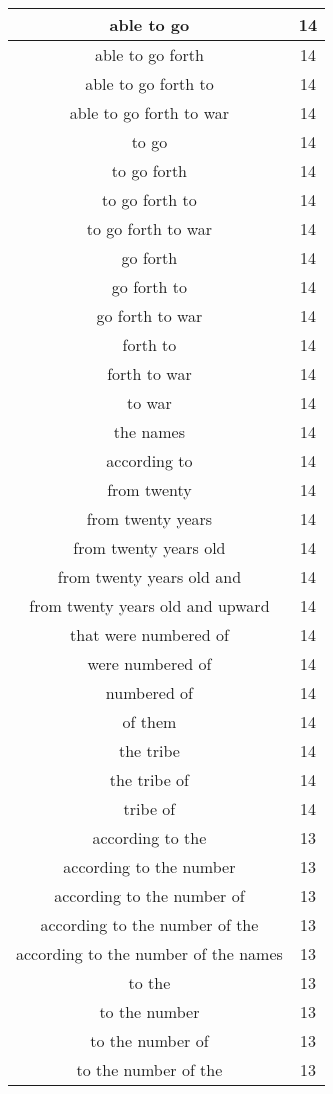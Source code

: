 \begin{center}
\begin{longtable}{|c|c|}
able to go & 14\\ \hline 
able to go forth & 14\\ \hline 
able to go forth to & 14\\ \hline 
able to go forth to war & 14\\ \hline 
to go & 14\\ \hline 
to go forth & 14\\ \hline 
to go forth to & 14\\ \hline 
to go forth to war & 14\\ \hline 
go forth & 14\\ \hline 
go forth to & 14\\ \hline 
go forth to war & 14\\ \hline 
forth to & 14\\ \hline 
forth to war & 14\\ \hline 
to war & 14\\ \hline 
the names & 14\\ \hline 
according to & 14\\ \hline 
from twenty & 14\\ \hline 
from twenty years & 14\\ \hline 
from twenty years old & 14\\ \hline 
from twenty years old and & 14\\ \hline 
from twenty years old and upward & 14\\ \hline 
that were numbered of & 14\\ \hline 
were numbered of & 14\\ \hline 
numbered of & 14\\ \hline 
of them & 14\\ \hline 
the tribe & 14\\ \hline 
the tribe of & 14\\ \hline 
tribe of & 14\\ \hline 
according to the & 13\\ \hline 
according to the number & 13\\ \hline 
according to the number of & 13\\ \hline 
according to the number of the & 13\\ \hline 
according to the number of the names & 13\\ \hline 
to the & 13\\ \hline 
to the number & 13\\ \hline 
to the number of & 13\\ \hline 
to the number of the & 13\\ \hline 

\end{longtable}
\end{center}
